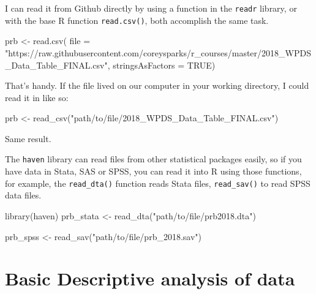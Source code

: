 \documentclass[
]{book}
\newenvironment{Shaded}{\begin{snugshade}}{\end{snugshade}}
\newcommand{\AttributeTok}[1]{\textcolor[rgb]{0.77,0.63,0.00}{#1}}
\newcommand{\ConstantTok}[1]{\textcolor[rgb]{0.00,0.00,0.00}{#1}}
\newcommand{\FunctionTok}[1]{\textcolor[rgb]{0.00,0.00,0.00}{#1}}
\newcommand{\NormalTok}[1]{#1}
\newcommand{\OtherTok}[1]{\textcolor[rgb]{0.56,0.35,0.01}{#1}}
\newcommand{\StringTok}[1]{\textcolor[rgb]{0.31,0.60,0.02}{#1}}
\begin{document}
I can read it from Github directly by using a function in the \texttt{readr}
library, or with the base R function \texttt{read.csv()}, both accomplish the
same task.

\begin{Shaded}
\begin{Highlighting}[]
\NormalTok{prb }\OtherTok{\textless{}{-}} \FunctionTok{read.csv}\NormalTok{(}
  \AttributeTok{file =} \StringTok{"https://raw.githubusercontent.com/coreysparks/r\_courses/master/2018\_WPDS\_Data\_Table\_FINAL.csv"}\NormalTok{, }
  \AttributeTok{stringsAsFactors =} \ConstantTok{TRUE}\NormalTok{)}
\end{Highlighting}
\end{Shaded}

That's handy. If the file lived on our computer in your working
directory, I could read it in like so:

\begin{Shaded}
\begin{Highlighting}[]
\NormalTok{prb }\OtherTok{\textless{}{-}} \FunctionTok{read\_csv}\NormalTok{(}\StringTok{"path/to/file/2018\_WPDS\_Data\_Table\_FINAL.csv"}\NormalTok{)}
\end{Highlighting}
\end{Shaded}

Same result.

The \texttt{haven} library \citet{haven} can read files from other statistical
packages easily, so if you have data in Stata, SAS or SPSS, you can read
it into R using those functions, for example, the \texttt{read\_dta()} function
reads Stata files, \texttt{read\_sav()} to read SPSS data files.

\begin{Shaded}
\begin{Highlighting}[]
\FunctionTok{library}\NormalTok{(haven)}
\NormalTok{prb\_stata }\OtherTok{\textless{}{-}} \FunctionTok{read\_dta}\NormalTok{(}\StringTok{"path/to/file/prb2018.dta"}\NormalTok{)}

\NormalTok{prb\_spss }\OtherTok{\textless{}{-}} \FunctionTok{read\_sav}\NormalTok{(}\StringTok{"path/to/file/prb\_2018.sav"}\NormalTok{)}
\end{Highlighting}
\end{Shaded}

\hypertarget{basic-descriptive-analysis-of-data}{%
\section{Basic Descriptive analysis of data}\label{basic-descriptive-analysis-of-data}}
\end{document}
